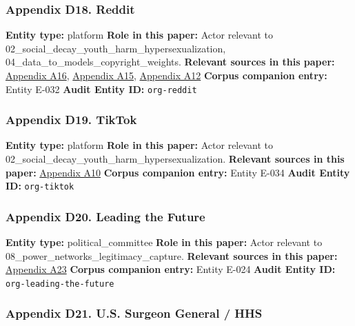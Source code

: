 \documentclass[
  american,
  11pt,
  letterpaper,
]{article}
\begin{document}
\subsubsection{Appendix D18. Reddit}\label{appendix-d18-reddit}

\textbf{Entity type:} platform \textbf{Role in this paper:} Actor
relevant to 02\_social\_decay\_youth\_harm\_hypersexualization,
04\_data\_to\_models\_copyright\_weights. \textbf{Relevant sources in
this paper:}
\hyperref[appendix-a16-reddit-strikes-60m-deal-allowing-google-to-train-ai-models-on-its-posts-unveils-ipo-plans]{Appendix
A16},
\hyperref[appendix-a15-language-models-are-unsupervised-multitask-learners]{Appendix
A15},
\hyperref[appendix-a12-quantifying-social-organization-and-political-polarization-in-online-platforms]{Appendix
A12} \textbf{Corpus companion entry:} Entity E-032 \textbf{Audit Entity
ID:} \texttt{org-reddit}

\subsubsection{Appendix D19. TikTok}\label{appendix-d19-tiktok}

\textbf{Entity type:} platform \textbf{Role in this paper:} Actor
relevant to 02\_social\_decay\_youth\_harm\_hypersexualization.
\textbf{Relevant sources in this paper:}
\hyperref[appendix-a10-when-kids-mode-isn-t-for-kids-investigating-tiktok-s-under-13-experience]{Appendix
A10} \textbf{Corpus companion entry:} Entity E-034 \textbf{Audit Entity
ID:} \texttt{org-tiktok}

\subsubsection{Appendix D20. Leading the
Future}\label{appendix-d20-leading-the-future}

\textbf{Entity type:} political\_committee \textbf{Role in this paper:}
Actor relevant to 08\_power\_networks\_legitimacy\_capture.
\textbf{Relevant sources in this paper:}
\hyperref[appendix-a23-leading-the-future-committee-overview]{Appendix
A23} \textbf{Corpus companion entry:} Entity E-024 \textbf{Audit Entity
ID:} \texttt{org-leading-the-future}

\subsubsection{Appendix D21. U.S. Surgeon General /
HHS}\label{appendix-d21-u-s-surgeon-general-hhs}
\end{document}
